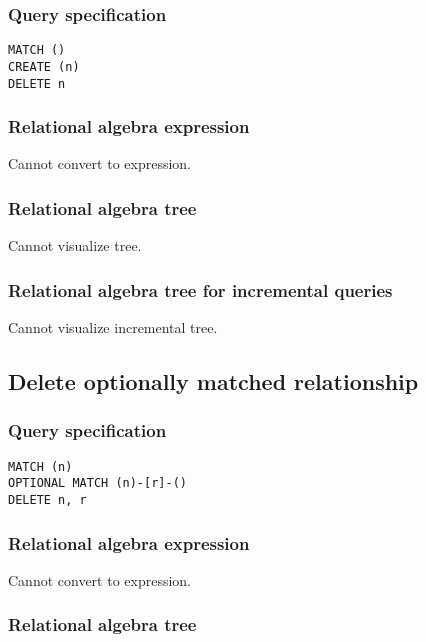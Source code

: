 \subsubsection*{Query specification}

\begin{lstlisting}
MATCH ()
CREATE (n)
DELETE n
\end{lstlisting}

\subsubsection*{Relational algebra expression}

Cannot convert to expression.

\subsubsection*{Relational algebra tree}

Cannot visualize tree.

\subsubsection*{Relational algebra tree for incremental queries}

Cannot visualize incremental tree.

\subsection{Delete optionally matched relationship}

\subsubsection*{Query specification}

\begin{lstlisting}
MATCH (n)
OPTIONAL MATCH (n)-[r]-()
DELETE n, r
\end{lstlisting}

\subsubsection*{Relational algebra expression}

Cannot convert to expression.

\subsubsection*{Relational algebra tree}

